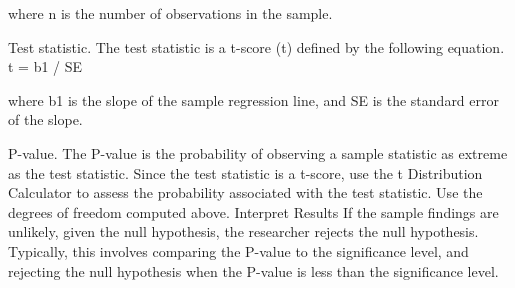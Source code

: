 \documentclass[a4paper,12pt]{article}
\begin{document}
where n is the number of observations in the sample.

Test statistic. The test statistic is a t-score (t) defined by the following equation.
t = b1 / SE

where b1 is the slope of the sample regression line, and SE is the standard error of the slope.

P-value. The P-value is the probability of observing a sample statistic as extreme as the test statistic. Since the test statistic is a t-score, use the t Distribution Calculator to assess the probability associated with the test statistic. Use the degrees of freedom computed above.
Interpret Results
If the sample findings are unlikely, given the null hypothesis, the researcher rejects the null hypothesis. Typically, this involves comparing the P-value to the significance level, and rejecting the null hypothesis when the P-value is less than the significance level.
\end{document}
